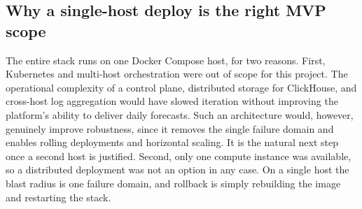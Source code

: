 \subsection{Why a single-host deploy is the right MVP scope}

The entire stack runs on one Docker Compose host, for two reasons. First,
Kubernetes and multi-host orchestration were out of scope for this project. The
operational complexity of a control plane, distributed storage for ClickHouse,
and cross-host log aggregation would have slowed iteration without improving the
platform's ability to deliver daily forecasts. Such an architecture would,
however, genuinely improve robustness, since it removes the single failure domain
and enables rolling deployments and horizontal scaling. It is the natural next
step once a second host is justified. Second, only one compute instance was available,
so a distributed deployment was not an option in any case. On a single host the
blast radius is one failure domain, and rollback is simply rebuilding the image
and restarting the stack.

